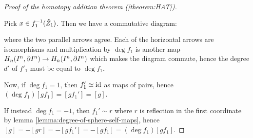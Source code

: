 \begin{proof}[Proof of the homotopy addition theorem (\ref{theorem:HAT})]
\begin{claimproof}
Pick $x\in f_1^{-1}(\mathring Z_1)$. Then we have a commutative diagram:
\begin{center}
\end{center}
where the two parallel arrows agree. Each of the horizontal arrows are isomorphisms and multiplication by $\deg f_1$ is another map $H_n(I^n,\partial I^n)\to H_n(I^n,\partial I^n)$ which makes the diagram commute, hence the degree $d'$ of $f'_1$ must be equal to $\deg f_1$.
\end{claimproof}

Now, if $\deg f_1=1$, then $f_1'\simeq\operatorname{id}$ as maps of pairs, hence $(\deg f_1)[gf_1]=[gf_1']=[g]$.

If instead $\deg f_1=-1$, then $f_1'\sim r$ where $r$ is reflection in the first coordinate by lemma \ref{lemma:degree-of-sphere-self-maps}, hence $[g]=-[gr]=-[gf_1']=-[gf_1]=(\deg f_1)[gf_1]$.

\end{proof}
